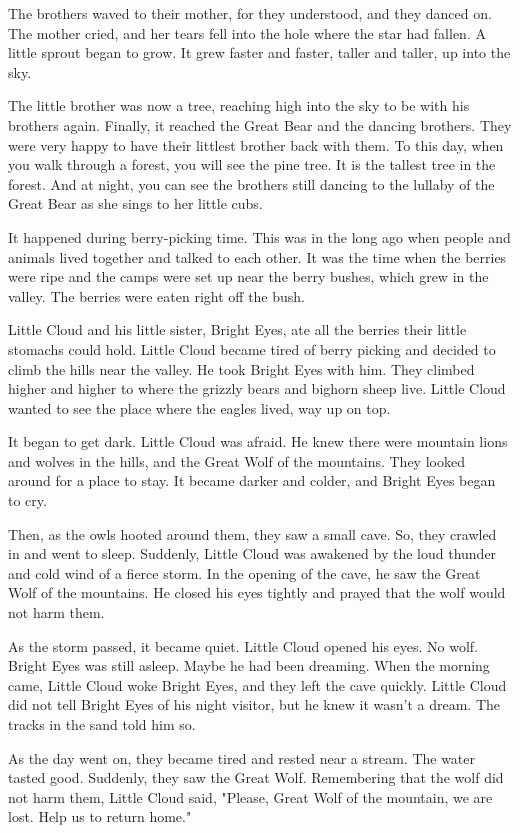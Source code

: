 The brothers waved to their mother, for they understood, and they danced on. The mother cried, and her tears fell into the hole where the star had fallen. A little sprout began to grow. It grew faster and faster, taller and taller, up into the sky.

The little brother was now a tree, reaching high into the sky to be with his brothers again. Finally, it reached the Great Bear and the dancing brothers. They were very happy to have their littlest brother back with them. To this day, when you walk through a forest, you will see the pine tree. It is the tallest tree in the forest. And at night, you can see the brothers still dancing to the lullaby of the Great Bear as she sings to her little cubs.

It happened during berry-picking time. This was in the long ago when people and animals lived together and talked to each other. It was the time when the berries were ripe and the camps were set up near the berry bushes, which grew in the valley. The berries were eaten right off the bush.

Little Cloud and his little sister, Bright Eyes, ate all the berries their little stomachs could hold. Little Cloud became tired of berry picking and decided to climb the hills near the valley. He took Bright Eyes with him. They climbed higher and higher to where the grizzly bears and bighorn sheep live. Little Cloud wanted to see the place where the eagles lived, way up on top.

It began to get dark. Little Cloud was afraid. He knew there were mountain lions and wolves in the hills, and the Great Wolf of the mountains. They looked around for a place to stay. It became darker and colder, and Bright Eyes began to cry.

Then, as the owls hooted around them, they saw a small cave. So, they crawled in and went to sleep. Suddenly, Little Cloud was awakened by the loud thunder and cold wind of a fierce storm. In the opening of the cave, he saw the Great Wolf of the mountains. He closed his eyes tightly and prayed that the wolf would not harm them.

As the storm passed, it became quiet. Little Cloud opened his eyes. No wolf. Bright Eyes was still asleep. Maybe he had been dreaming. When the morning came, Little Cloud woke Bright Eyes, and they left the cave quickly. Little Cloud did not tell Bright Eyes of his night visitor, but he knew it wasn't a dream. The tracks in the sand told him so.

As the day went on, they became tired and rested near a stream. The water tasted good. Suddenly, they saw the Great Wolf. Remembering that the wolf did not harm them, Little Cloud said, "Please, Great Wolf of the mountain, we are lost. Help us to return home."

